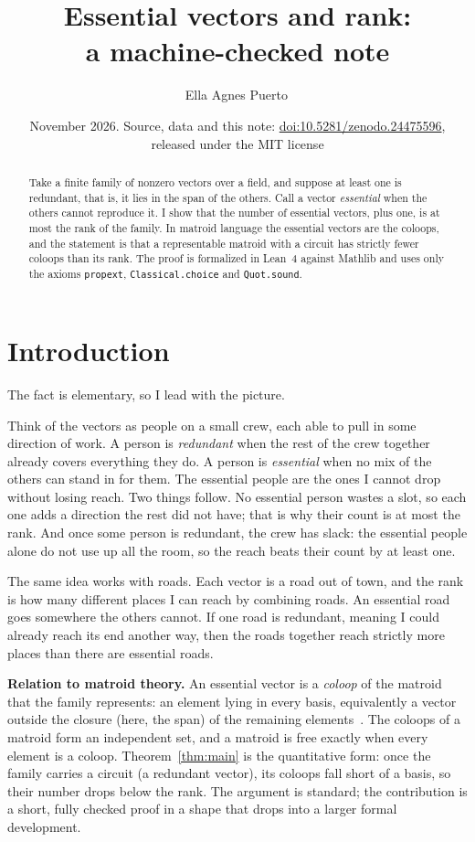 \documentclass[11pt]{amsart}
\title[Essential vectors and rank]{Essential vectors and rank:\\ a machine-checked note}
\author{Ella Agnes Puerto\,\orcidlink{0009-0005-1624-2025}}
\date{November 2026. Source, data and this note: \href{https://doi.org/10.5281/zenodo.24475596}{doi:10.5281/zenodo.24475596}, released under the MIT license}
\theoremstyle{definition}
\theoremstyle{remark}
\begin{document}
\begin{abstract}
Take a finite family of nonzero vectors over a field, and suppose at least one is redundant,
that is, it lies in the span of the others. Call a vector \emph{essential} when the others
cannot reproduce it. I show that the number of essential vectors, plus one, is at most the
rank of the family. In matroid language the essential vectors are the coloops, and the
statement is that a representable matroid with a circuit has strictly fewer coloops than its
rank. The proof is formalized in Lean~4 against Mathlib and uses only the axioms
\texttt{propext}, \texttt{Classical.choice} and \texttt{Quot.sound}.
\end{abstract}

\maketitle

\section{Introduction}\label{sec:intro}
The fact is elementary, so I lead with the picture.

Think of the vectors as people on a small crew, each able to pull in some direction of work. A
person is \emph{redundant} when the rest of the crew together already covers everything they
do. A person is \emph{essential} when no mix of the others can stand in for them. The essential
people are the ones I cannot drop without losing reach. Two things follow. No essential person
wastes a slot, so each one adds a direction the rest did not have; that is why their count is
at most the rank. And once some person is redundant, the crew has slack: the essential people
alone do not use up all the room, so the reach beats their count by at least one.

The same idea works with roads. Each vector is a road out of town, and the rank is how many
different places I can reach by combining roads. An essential road goes somewhere the others
cannot. If one road is redundant, meaning I could already reach its end another way, then the
roads together reach strictly more places than there are essential roads.

\smallskip\noindent\textbf{Relation to matroid theory.}
An essential vector is a \emph{coloop} of the matroid that the family represents: an element
lying in every basis, equivalently a vector outside the closure (here, the span) of the
remaining elements~\cite{Oxley}. The coloops of a matroid form an independent set, and a
matroid is free exactly when every element is a coloop. Theorem~\ref{thm:main} is the
quantitative form: once the family carries a circuit (a redundant vector), its coloops fall
short of a basis, so their number drops below the rank. The argument is standard; the
contribution is a short, fully checked proof in a shape that drops into a larger formal
development.
\end{document}

